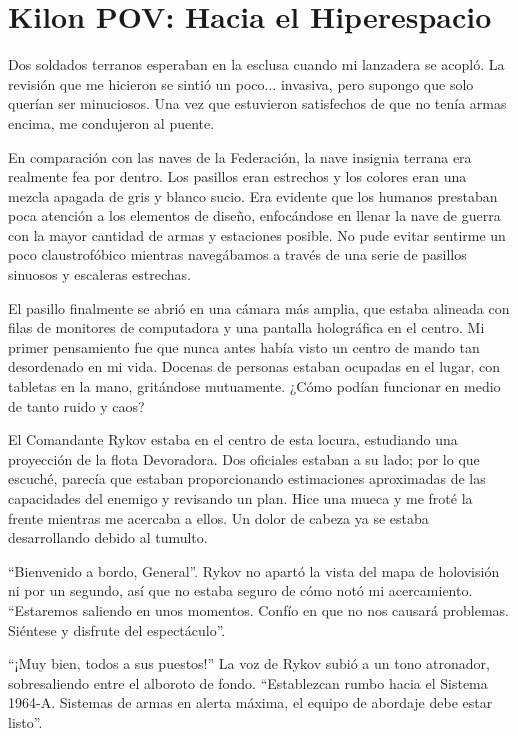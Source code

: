 \documentclass[spanish,12pt,a4paper,oneside,titlepage]{book}
\begin{document}
    \chapter{Kilon POV: Hacia el Hiperespacio}

    Dos soldados terranos esperaban en la esclusa cuando mi lanzadera se acopló. La revisión que me hicieron se sintió un poco... invasiva, pero supongo que solo querían ser minuciosos. Una vez que estuvieron satisfechos de que no tenía armas encima, me condujeron al puente.

    En comparación con las naves de la Federación, la nave insignia terrana era realmente fea por dentro. Los pasillos eran estrechos y los colores eran una mezcla apagada de gris y blanco sucio. Era evidente que los humanos prestaban poca atención a los elementos de diseño, enfocándose en llenar la nave de guerra con la mayor cantidad de armas y estaciones posible. No pude evitar sentirme un poco claustrofóbico mientras navegábamos a través de una serie de pasillos sinuosos y escaleras estrechas.

    El pasillo finalmente se abrió en una cámara más amplia, que estaba alineada con filas de monitores de computadora y una pantalla holográfica en el centro. Mi primer pensamiento fue que nunca antes había visto un centro de mando tan desordenado en mi vida. Docenas de personas estaban ocupadas en el lugar, con tabletas en la mano, gritándose mutuamente. ¿Cómo podían funcionar en medio de tanto ruido y caos?

    El Comandante Rykov estaba en el centro de esta locura, estudiando una proyección de la flota Devoradora. Dos oficiales estaban a su lado; por lo que escuché, parecía que estaban proporcionando estimaciones aproximadas de las capacidades del enemigo y revisando un plan. Hice una mueca y me froté la frente mientras me acercaba a ellos. Un dolor de cabeza ya se estaba desarrollando debido al tumulto.

    “Bienvenido a bordo, General”. Rykov no apartó la vista del mapa de holovisión ni por un segundo, así que no estaba seguro de cómo notó mi acercamiento. ``Estaremos saliendo en unos momentos. Confío en que no nos causará problemas. Siéntese y disfrute del espectáculo''.

    ``¡Muy bien, todos a sus puestos!'' La voz de Rykov subió a un tono atronador, sobresaliendo entre el alboroto de fondo. ``Establezcan rumbo hacia el Sistema 1964-A. Sistemas de armas en alerta máxima, el equipo de abordaje debe estar listo''.
\end{document}
